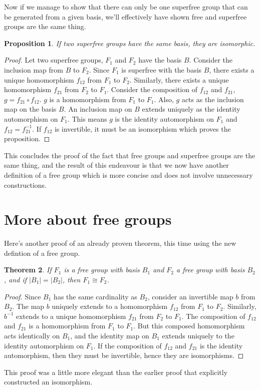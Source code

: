 \documentclass[12pt]{article}
\newtheorem{thm}{Theorem}[section]
\newtheorem{prop}[thm]{Proposition}
\theoremstyle{definition}
\begin{document}
Now if we manage to show that there can only be one superfree group that can be generated from a given basis, we'll effectively have shown free and superfree groups are the same thing.

\begin{prop}\label{univ}
If two superfree groups have the same basis, they are isomorphic.
\end{prop}

\begin{proof}
Let two superfree groups, $F_1$ and $F_2$ have the basis $B$. Consider the inclusion map from $B$ to $F_2$. Since $F_1$ is superfree with the basis $B$, there exists a unique homomorphism $f_{12}$ from $F_1$ to $F_2$. Similarly, there exists a unique homomorphism $f_{21}$ from $F_2$ to $F_1$. Consider the composition of $f_{12}$ and $f_{21}$, $g = f_{21} \circ f_{12}$. $g$ is a homomorphism from $F_1$ to $F_1$. Also, $g$ acts as the inclusion map on the basis $B$. An inclusion map on $B$ extends uniquely as the identity automorphism on $F_1$. This means $g$ is the identity automorphism on $F_1$ and $f_{12} = f_{21}^{-1}$. If $f_{12}$ is invertible, it must be an isomorphism which proves the proposition.
\end{proof}

This concludes the proof of the fact that free groups and superfree groups are the same thing, and the result of this endeavour is that we now have another definition of a free group which is more concise and does not involve unnecessary constructions.

\section{More about free groups}

Here's another proof of an already proven theorem, this time using the new defintion of a free group.

\begin{thm}
If $F_1$ is a free group with basis $B_1$ and $F_2$ a free group with basis $B_2$, and if $|B_1|=|B_2|$, then $F_1 \cong F_2$.
\end{thm}

\begin{proof}
Since $B_1$ has the same cardinality as $B_2$, consider an invertible map $b$ from $B_2$. The map $b$ uniquely extends to a homomorphism $f_{12}$ from $F_1$ to $F_2$. Similarly, $b^{-1}$ extends to a unique homomorphism $f_{21}$ from $F_2$ to $F_1$. The composition of $f_{12}$ and $f_{21}$ is a homomorphism from $F_1$ to $F_1$. But this composed homomorphism acts identically on $B_1$, and the identity map on $B_1$ extends uniquely to the identity automorphism on $F_1$. If the composition of $f_{12}$ and $f_{21}$ is the identity automorphism, then they must be invertible, hence they are isomorphisms.
\end{proof}
This proof was a little more elegant than the earlier proof that explicitly constructed an isomorphism.
\end{document}
